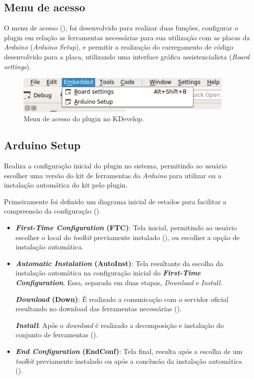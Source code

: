 \subsection{Menu de acesso}

O menu de acesso (), foi desenvolvido para realizar duas funções, configurar o plugin em relação as ferramentas necessárias para sua utilização com as placas da \textit{Arduino} (\textit{Arduino Setup}), e permitir a realização do carregamento de código desenvolvido para a placa, utilizando uma interface gráfica assistencialista (\textit{Board settings}).

\begin{figure}[!htb]
  \centering
  \caption[Menu do plugin no KDevelop]{Menu de acesso do plugin no KDevelop.}
  \label{fig:kdevelopMenu}
  \includegraphics[width=0.95\textwidth]{figuras/kdevelopMenu.png}
\end{figure}

\subsection{Arduino Setup}

Realiza a configuração inicial do plugin no sistema, permitindo ao usuário escolher uma versão do kit de ferramentas do \textit{Arduino} para utilizar ou a instalação automática do kit pelo plugin.

Primeiramente foi definido um diagrama inicial de estados para facilitar a compreensão da configuração ().

\begin{itemize}
\item \textbf{\textit{First-Time Configuration} (FTC)}: Tela inicial, permitindo ao usuário escolher o local do \textit{toolkit} previamente instalado (), ou escolher a opção de instalação automática. 

\item \textbf{\textit{Automatic Instalation} (AutoInst)}: Tela resultante da escolha da instalação automática na configuração inicial do \textbf{\textit{First-Time Configuration}}. Essa, separada em duas etapas, \textit{Download} e \textit{Install}.

\subitem \textbf{\textit{Download} (Down)}: É realizado a comunicação com o servidor oficial resultando no download das ferramentas necessárias ().

\subitem \textbf{\textit{Install}}: Após o \textit{download} é realizado a decomposição e instalação do conjunto de ferramentas ().

\item \textbf{\textit{End Configuration} (EndConf)}: Tela final, resulta após a escolha de um \textit{toolkit} previamente instalado ou após a conclusão da instalação automática ().
\end{itemize}

